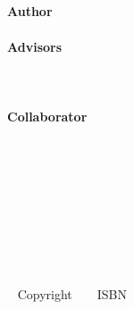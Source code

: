 {\thispagestyle{empty}

\mbox{ }

\begin{Huge}
\begin{center}
\coverTitle \\
\coverTitleAlt
\end{center}
\end{Huge}

\vfill

\begin{large}
\begin{center}
\firstSubtitleTextCover
\mbox{ } \\ \mbox{ } \\ 
{\Large \bfseries Author}\\
\textbf{\coverAuthor}\\[1.0cm]
{\Large \bfseries Advisors}\\
\textbf{\coverAdvisor}\\[0.3cm]
\ifx\coverCollaborator\undefined
\mbox{ } \\ \mbox{ } \\
\else
{\Large \bfseries Collaborator}\\
\textbf{\coverCollaborator}\\[0.3cm]
\fi
\mbox{ } \\ \mbox{ } \\ 
\secondSubtitleTextCover \\ [0.3em]
\end{center}
\end{large}

\vfill

\begin{large}
\begin{center}
\textbf{\institution}\\[0.2em]
    \mbox{ }  \\
\textbf{\coverPublicationDate}
\end{center}
\end{large}


\newpage
\thispagestyle{empty}
\mbox{ }

\vskip 13cm
\ifx\copyrightInfo\undefined
\mbox{ }
\else
Copyright \textcopyright\ \copyrightInfo
\fi
\vskip 3cm
\ifx\isbn\undefined
\mbox{ }
\else
ISBN \isbn
\fi

} %


